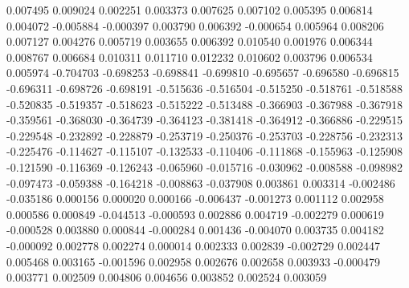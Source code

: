 0.007495
0.009024
0.002251
0.003373
0.007625
0.007102
0.005395
0.006814
0.004072
-0.005884
-0.000397
0.003790
0.006392
-0.000654
0.005964
0.008206
0.007127
0.004276
0.005719
0.003655
0.006392
0.010540
0.001976
0.006344
0.008767
0.006684
0.010311
0.011710
0.012232
0.010602
0.003796
0.006534
0.005974
-0.704703
-0.698253
-0.698841
-0.699810
-0.695657
-0.696580
-0.696815
-0.696311
-0.698726
-0.698191
-0.515636
-0.516504
-0.515250
-0.518761
-0.518588
-0.520835
-0.519357
-0.518623
-0.515222
-0.513488
-0.366903
-0.367988
-0.367918
-0.359561
-0.368030
-0.364739
-0.364123
-0.381418
-0.364912
-0.366886
-0.229515
-0.229548
-0.232892
-0.228879
-0.253719
-0.250376
-0.253703
-0.228756
-0.232313
-0.225476
-0.114627
-0.115107
-0.132533
-0.110406
-0.111868
-0.155963
-0.125908
-0.121590
-0.116369
-0.126243
-0.065960
-0.015716
-0.030962
-0.008588
-0.098982
-0.097473
-0.059388
-0.164218
-0.008863
-0.037908
0.003861
0.003314
-0.002486
-0.035186
0.000156
0.000020
0.000166
-0.006437
-0.001273
0.001112
0.002958
0.000586
0.000849
-0.044513
-0.000593
0.002886
0.004719
-0.002279
0.000619
-0.000528
0.003880
0.000844
-0.000284
0.001436
-0.004070
0.003735
0.004182
-0.000092
0.002778
0.002274
0.000014
0.002333
0.002839
-0.002729
0.002447
0.005468
0.003165
-0.001596
0.002958
0.002676
0.002658
0.003933
-0.000479
0.003771
0.002509
0.004806
0.004656
0.003852
0.002524
0.003059
